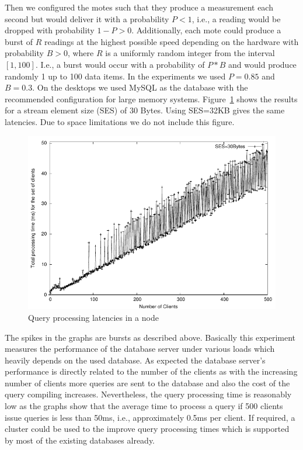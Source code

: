 Then we configured the motes such that they produce a measurement each second
but would deliver it with a probability $P<1$, i.e., a reading would be dropped
with probability $1-P>0$.  Additionally, each mote could produce a burst of $R$
readings at the highest possible speed depending on the hardware with
probability $B>0$, where $R$ is a uniformly random integer from the interval
$[1,100]$. I.e., a burst would occur with a probability of $P * B$ and would
produce randomly 1 up to 100 data items.  In the experiments we used $P=0.85$
and $B=0.3$. On the desktops we used MySQL as the database with the recommended
configuration for large memory systems.
Figure~\ref{fig:QueryProcessingLatency} shows the results for a stream element
size (SES) of 30 Bytes. Using SES=32KB gives the same latencies. Due
to space limitations we do not include this figure.


\begin{figure}%
  \centering
  \includegraphics[width=0.8\columnwidth]{ch-gsn-figures/query-processing-time-30bytes}
  \caption{Query processing latencies in a node}
  \label{fig:QueryProcessingLatency}
\end{figure}

The spikes in the graphs are bursts as described above. Basically this
experiment measures the performance of the database server under various loads
which heavily depends on the used database. As expected the database server's
performance is directly related to the number of the clients as with the
increasing number of clients more queries are sent to the database and also the
cost of the query compiling increases. Nevertheless, the query processing time
is reasonably low as the graphs show that the average time to process a query
if 500 clients issue queries is less than 50ms, i.e., approximately 0.5ms per
client. If required, a cluster could be used to the improve query processing
times which is supported by most of the existing databases already.


